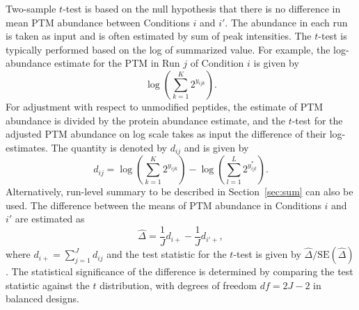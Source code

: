 \documentclass{mcp}
\def\secref#1{Section~\ref{#1}}
\begin{document}
Two-sample $t$-test is based on the null hypothesis that there is no difference in mean PTM abundance between Conditions $i$ and $i'$. The abundance in each run is taken as input and is often estimated by sum of peak intensities. The $t$-test is typically performed based on the log of summarized value. For example, the log-abundance estimate for the PTM in Run $j$ of Condition $i$ is given by
\[
\log \left( \sum_{k=1}^{K} 2^{y_{ijk}} \right).
\]
For adjustment with respect to unmodified peptides, the estimate of PTM abundance is divided by the protein abundance estimate, 
and the $t$-test for the adjusted PTM abundance on log scale takes as input the difference of their log-estimates.
The quantity is denoted by $d_{ij}$ and is given by
\[
d_{ij} = \log \left( \sum_{k=1}^{K} 2^{y_{ijk}} \right) - \log \left( \sum_{l=1}^{L} 2^{y_{ijl}^{\ast}} \right).
\]
Alternatively, run-level summary to be described in \secref{sec:sum} can also be used. The difference between the means of PTM abundance in Conditions $i$ and $i'$ are estimated as
\[
\hat{\Delta} = \frac{1}{J} d_{i+} - \frac{1}{J} d_{i'+},
\]
where $d_{i+} = \sum_{j=1}^{J} d_{ij}$ and the test statistic for the $t$-test is given by $\hat{\Delta} / \mathrm{SE}(\hat{\Delta})$. The statistical significance of the difference is determined by comparing the test statistic against the $t$ distribution, with degrees of freedom $df=2J-2$ in balanced designs.
\end{document}
